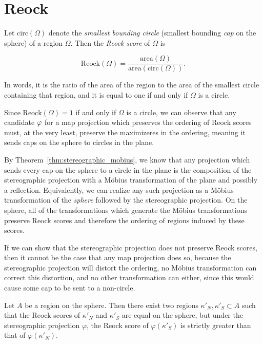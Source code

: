 \section{Reock}\label{sec:reock}

Let $\mathrm{circ}(\Omega)$ denote the \textit{smallest bounding
circle} (smallest bounding \textit{cap} on the sphere) of a region
$\Omega$.  Then the \textit{Reock score} of $\Omega$ is 

$$\mathrm{Reock}(\Omega)=
\frac{\mathrm{area}(\Omega)}{\mathrm{area}(\mathrm{circ}(\Omega))}.$$

In words, it is the ratio of the area of the region to the area of the
smallest circle containing that region, and it is equal to one if and
only if $\Omega$ is a circle.  

Since $\mathrm{Reock}(\Omega)=1$ if and only if $\Omega$ is a circle,
we can observe that any candidate $\varphi$ for a map projection 
which preserves the ordering of Reock scores must, at the 
very least, preserve the maximizeres in the ordering, meaning 
it sends caps on the sphere to circles in the plane.  

By Theorem~\ref{thm:stereographic_mobius}, we know that any projection which sends every cap on the sphere to a 
circle in the plane is the composition of the stereographic projection with a M\"obius transformation of the plane and possibly a reflection.  Equivalently, we can realize any such projection as a M\"obius transformation of the \textit{sphere} followed by the stereographic projection.  On the sphere, all of the transformations which generate the  M\"obius transformations preserve Reock scores and therefore the ordering of regions induced by these scores. 

If we can show that the stereographic projection does not preserve Reock scores, then it cannot be the case that any map projection does so, because the stereographic projection will distort the ordering, no M\"obius transformation can correct this distortion, and no other transformation can either, since this would cause some cap to be sent to a non-circle.


\begin{theorem}\label{thm:reock}
  Let $A$ be a region on the sphere.  Then there exist two regions
  $\kappa'_N,\kappa'_S\subset A$ such that the Reock scores of
  $\kappa'_N$ and $\kappa'_S$ are equal on the sphere, but under the
  stereographic projection $\varphi$, the Reock score of $\varphi(\kappa'_S)$
  is strictly greater than that of $\varphi(\kappa'_N)$. 
\end{theorem}


